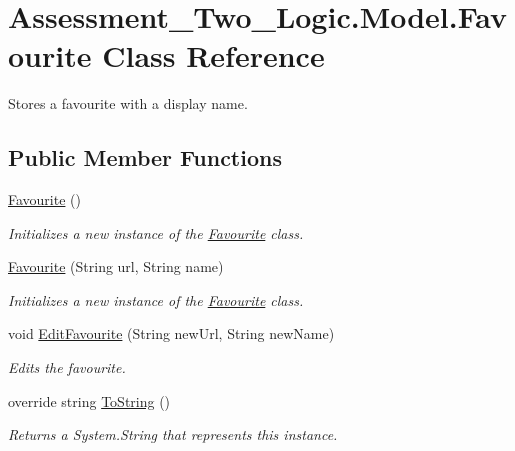 \hypertarget{class_assessment___two___logic_1_1_model_1_1_favourite}{
\section{Assessment\_\-Two\_\-Logic.Model.Favourite Class Reference}
\label{class_assessment___two___logic_1_1_model_1_1_favourite}
}


Stores a favourite with a display name.  


\subsection*{Public Member Functions}
\begin{DoxyCompactItemize}
\item 
\hyperlink{class_assessment___two___logic_1_1_model_1_1_favourite_a550a30bcb82c22d7080f86522bd2b330}{Favourite} ()
\begin{DoxyCompactList}\small\item\em Initializes a new instance of the \hyperlink{class_assessment___two___logic_1_1_model_1_1_favourite}{Favourite} class. \item\end{DoxyCompactList}\item 
\hyperlink{class_assessment___two___logic_1_1_model_1_1_favourite_a8e4e12c750c225cd5e12ca4b819134b3}{Favourite} (String url, String name)
\begin{DoxyCompactList}\small\item\em Initializes a new instance of the \hyperlink{class_assessment___two___logic_1_1_model_1_1_favourite}{Favourite} class. \item\end{DoxyCompactList}\item 
void \hyperlink{class_assessment___two___logic_1_1_model_1_1_favourite_a6908954a5c325164b2bdf0f49222ad36}{EditFavourite} (String newUrl, String newName)
\begin{DoxyCompactList}\small\item\em Edits the favourite. \item\end{DoxyCompactList}\item 
override string \hyperlink{class_assessment___two___logic_1_1_model_1_1_favourite_acb1d53af11bd394644e178ccbd8decae}{ToString} ()
\begin{DoxyCompactList}\small\item\em Returns a System.String that represents this instance. \item\end{DoxyCompactList}\end{DoxyCompactItemize}

